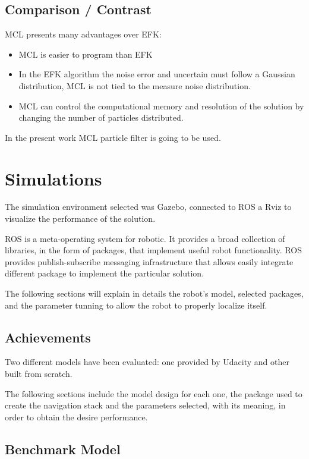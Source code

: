 \documentclass[10pt,journal,compsoc]{IEEEtran}
\begin{document}
\subsection{Comparison / Contrast}

MCL presents many advantages over EFK:

\begin{itemize}
\item MCL is easier to program than EFK 
\item In the EFK algorithm the noise error and uncertain must follow a Gaussian distribution, MCL is not tied to the measure noise distribution.
\item MCL can control the computational memory and resolution of the solution by changing the number of particles distributed.
\end{itemize} 

In the present work MCL particle filter is going to be used.


\section{Simulations}
The simulation environment selected was Gazebo, connected to ROS a Rviz to visualize the performance of the solution. 

ROS is a meta-operating system for robotic. It provides a broad collection of libraries, in the form of packages, that implement useful robot functionality. ROS provides publish-subscribe messaging infrastructure that allows easily integrate different package to implement the particular solution.

The following sections will explain in details the robot's model, selected packages, and the parameter tunning to allow the robot to properly localize itself.

\subsection{Achievements}
Two different models have been evaluated: one provided by Udacity and other built from scratch.

The following sections include the model design for each one, the package used to create the navigation stack and the parameters selected, with its meaning, in order to obtain the desire performance.
\subsection{Benchmark Model}
\end{document}

